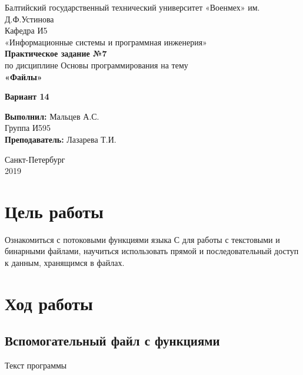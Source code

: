 \documentclass[a4paper,14pt]{extarticle}
\begin{document}
\begin{titlepage}
\centering
\small Балтийский государственный технический университет «Военмех» им. Д.Ф.Устинова \\
\vspace{3cm}
\normalsize Кафедра И5\\
«Информационные системы и программная инженерия»\\
\vspace{3cm}
\textbf{Практическое задание №7}\\
по дисциплине Основы программирования на тему\\ 
\textbf{«Файлы»}\\
\begin{center}
{\large\bf Вариант 14}
\end{center}
\vfill

\begin{flushleft}
\textbf{Выполнил:}
\hfill {Мальцев А.С.} \\
\hfill {Группа И595} \\
\vspace{1cm}
\textbf{Преподаватель:}
\hfill {Лазарева Т.И.} \\
\end{flushleft}
\vspace{3cm}

{\centering Санкт-Петербург \\ 
\vspace{0.15cm}
2019}
\end{titlepage}
\setcounter{page}{2}
\section{Цель работы}
Ознакомиться с потоковыми функциями языка С для работы с текстовыми и бинарными файлами, научиться использовать прямой и последовательный доступ к данным, хранящимся в файлах.

\section{Ход работы}
\subsection{Вспомогательный файл с функциями}

\begin{center}
Текст программы\\
\vspace{0.6cm}
\end{center}
\end{document}
